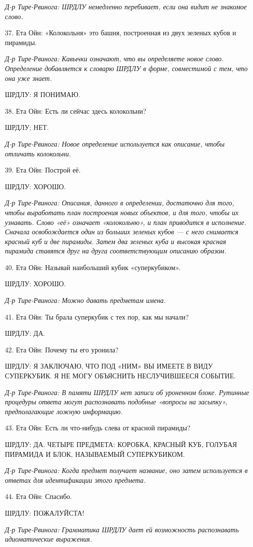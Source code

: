 \documentclass[../main.tex]{subfiles}
\begin{document}
\begin{dialogue}
\emph{Д-р Тире-Рвинога: ШРДЛУ немедленно перебивает, если она видит не знакомое слово.}

37. Ета Ойн: «Колокольня» это башня, построенная из двух зеленых кубов и пирамиды.

\emph{Д-р Тире-Рвинога: Кавычки означают, что вы определяете новое слово. Определение добавляется к словарю ШРДЛУ в форме, совместимой с тем, что она уже знает.}

ШРДЛУ: Я ПОНИМАЮ.

38. Ета Ойн: Есть ли сейчас здесь колокольни?

ШРДЛУ; НЕТ.

\emph{Д-р Тире-Рвинога: Новое определение используется как описание, чтобы отличать колокольни.}

39. Ета Ойн: Построй её.

ШРДЛУ: ХОРОШО.

\emph{Д-р Тире-Рвинога: Описания, данного в определении, достаточно для того, чтобы выработать план построения новых объектов, и для того, чтобы их узнавать. Слово «её» означает «колокольню», и план приводится в исполнение. Сначала освобождается один из больших зеленых кубов --- с него снимается красный куб и две пирамиды. Затем два зеленых куба и высокая красная пирамида ставятся друг на друга соответствующим описанию образом.}

40. Ета Ойн: Называй наибольший кубик «суперкубиком».

ШРДЛУ: ХОРОШО.

\emph{Д-р Тире-Рвинога: Можно давать предметам имена.}

41. Ета Ойн: Ты брала суперкубик с тех пор, как мы начали?

ШРДЛУ: ДА.

42. Ета Ойн: Почему ты его уронила?

ШРДЛУ: Я ЗАКЛЮЧАЮ, ЧТО ПОД «НИМ» ВЫ ИМЕЕТЕ В ВИДУ СУПЕРКУБИК. Я НЕ МОГУ ОБЪЯСНИТЬ НЕСЛУЧИВШЕЕСЯ СОБЫТИЕ.

\emph{Д-р Тире-Рвинога: В памяти ШРДЛУ нет записи об уроненном блоке. Рутинные процедуры ответа могут распознавать подобные «вопросы на засыпку», предполагающие ложную информацию.}

43. Ета Ойн: Есть ли что-нибудь слева от красной пирамиды?

ШРДЛУ: ДА. ЧЕТЫРЕ ПРЕДМЕТА: КОРОБКА, КРАСНЫЙ КУБ, ГОЛУБАЯ ПИРАМИДА И БЛОК, НАЗЫВАЕМЫЙ СУПЕРКУБИКОМ.

\emph{Д-р Тире-Рвинога: Когда предмет получает название, оно затем используется в ответах для идентификации этого предмета.}

44. Ета Ойн: Спасибо.

ШРДЛУ: ПОЖАЛУЙСТА!

\emph{Д-р Тире-Рвинога: Грамматика ШРДЛУ дает ей возможность распознавать идиоматические выражения.}

\end{dialogue}
\end{document}
